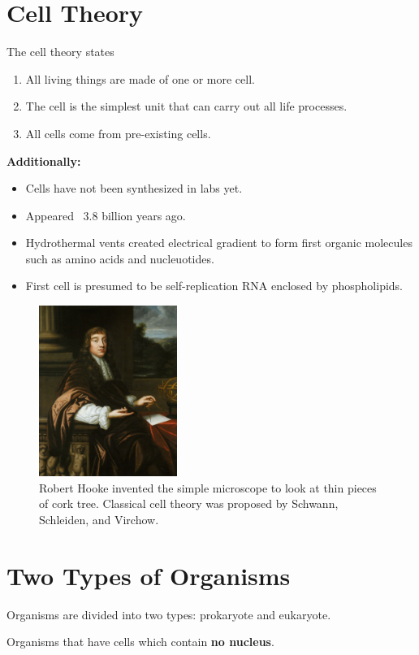 \documentclass[12pt]{report}
\begin{document}
\section{Cell Theory}
\begin{definition}
    The cell theory states
    \begin{enumerate}
    \setlength\itemsep{0.5em}
        \item{All living things are made of one or more  cell.}
        \item{The cell is the simplest unit that can carry out all life processes.}
        \item{All cells come from pre-existing cells.}
    \end{enumerate}
\end{definition}

\textbf{Additionally:}
\begin{itemize}
    \item{Cells have not been synthesized in labs yet.}
    \item{Appeared ~3.8 billion years ago.}
    \item{Hydrothermal vents created electrical gradient to form first organic molecules such as amino acids and nucleuotides.}
    \item{First cell is presumed to be self-replication RNA enclosed by phospholipids.}
\end{itemize}

\begin{figure}[H]
\centering
    \includegraphics[width=0.4\textwidth]{../figures/robert hooke.jpg}
    \caption{Robert Hooke invented the simple microscope to look at thin pieces of cork tree. Classical cell theory was proposed by Schwann, Schleiden, and Virchow.}
\end{figure}

\section{Two Types of Organisms}
Organisms are divided into two types: prokaryote and eukaryote. 
\begin{definition}[Prokaryote]
    Organisms that have cells which contain \textbf{no nucleus}. 
\end{definition}
\end{document}
